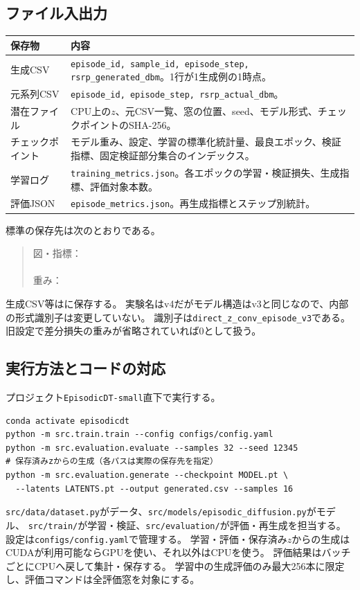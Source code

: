 \documentclass[a4paper,10pt]{article}
\begin{document}
\subsection{ファイル入出力}
\begin{center}\small
\begin{tabularx}{\linewidth}{@{}lY@{}}\toprule
保存物 & 内容\\\midrule
生成CSV & \texttt{episode\_id, sample\_id, episode\_step, rsrp\_generated\_dbm}。1行が1生成例の1時点。\\
元系列CSV & \texttt{episode\_id, episode\_step, rsrp\_actual\_dbm}。\\
潜在ファイル & CPU上の$z$、元CSV一覧、窓の位置、seed、モデル形式、チェックポイントのSHA-256。\\
チェックポイント & モデル重み、設定、学習の標準化統計量、最良エポック、検証指標、固定検証部分集合のインデックス。\\
学習ログ & \texttt{training\_metrics.json}。各エポックの学習・検証損失、生成指標、評価対象本数。\\
評価JSON & \texttt{episode\_metrics.json}。再生成指標とステップ別統計。\\\bottomrule
\end{tabularx}\end{center}
標準の保存先は次のとおりである。
\begin{quote}\small
図・指標：\\
\\
重み：\\
\end{quote}
生成CSV等はに保存する。
実験名はv4だがモデル構造はv3と同じなので、内部の形式識別子は変更していない。
識別子は\texttt{direct\_z\_conv\_episode\_v3}である。
旧設定で差分損失の重みが省略されていれば0として扱う。

\subsection{実行方法とコードの対応}
プロジェクト\texttt{EpisodicDT-small}直下で実行する。
\begin{verbatim}
conda activate episodicdt
python -m src.train.train --config configs/config.yaml
python -m src.evaluation.evaluate --samples 32 --seed 12345
# 保存済みzからの生成（各パスは実際の保存先を指定）
python -m src.evaluation.generate --checkpoint MODEL.pt \
  --latents LATENTS.pt --output generated.csv --samples 16
\end{verbatim}
\texttt{src/data/dataset.py}がデータ、\texttt{src/models/episodic\_diffusion.py}がモデル、
\texttt{src/train/}が学習・検証、\texttt{src/evaluation/}が評価・再生成を担当する。
設定は\texttt{configs/config.yaml}で管理する。
学習・評価・保存済み$z$からの生成はCUDAが利用可能ならGPUを使い、それ以外はCPUを使う。
評価結果はバッチごとにCPUへ戻して集計・保存する。
学習中の生成評価のみ最大256本に限定し、評価コマンドは全評価窓を対象にする。
\end{document}
